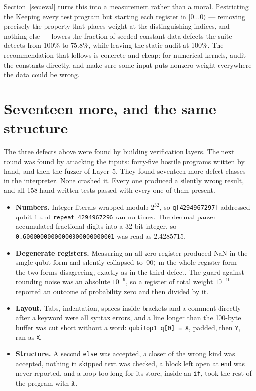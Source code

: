 \documentclass[11pt]{article}
\newcommand{\ket}[1]{\ensuremath{|#1\rangle}}
\begin{document}
Section~\ref{sec:eval} turns this into a measurement rather than a moral. Restricting the
Keeping every test program but starting each register in \ket{0\ldots0} --- removing
precisely the property that places weight at the distinguishing indices, and nothing else ---
lowers the fraction of seeded constant-data defects the suite detects from 100\% to
75.8\%, while leaving the static audit at 100\%. The
recommendation that follows is concrete and cheap: for numerical kernels, audit the
constants directly, and make sure some input puts nonzero weight everywhere the data could
be wrong.

\section{Seventeen more, and the same structure}
\label{sec:second}

The three defects above were found by building verification layers. The next round was
found by attacking the inputs: forty-five hostile programs written by hand, and then the
fuzzer of Layer~5. They found seventeen more defect classes in the interpreter. None
crashed it. Every one produced a silently wrong result, and all 158 hand-written tests
passed with every one of them present.

\begin{itemize}
  \item \textbf{Numbers.} Integer literals wrapped modulo $2^{32}$, so \texttt{q[4294967297]}
    addressed qubit 1 and \texttt{repeat 4294967296} ran no times. The decimal parser
    accumulated fractional digits into a 32-bit integer, so
    \texttt{0.60000000000000000000000001} was read as 2.4285715.
  \item \textbf{Degenerate registers.} Measuring an all-zero register produced NaN in the
    single-qubit form and silently collapsed to \ket{00} in the whole-register form ---
    the two forms disagreeing, exactly as in the third defect. The guard against rounding
    noise was an absolute $10^{-9}$, so a register of total weight $10^{-10}$ reported an
    outcome of probability zero and then divided by it.
  \item \textbf{Layout.} Tabs, indentation, spaces inside brackets and a comment directly
    after a keyword were all syntax errors, and a line longer than the 100-byte buffer was
    cut short without a word: \texttt{qubitop1 q[0] = X}, padded, then \texttt{Y}, ran
    as \texttt{X}.
  \item \textbf{Structure.} A second \texttt{else} was accepted, a closer of the wrong kind
    was accepted, nothing in skipped text was checked, a block left open at \texttt{end}
    was never reported, and a loop too long for its store, inside an \texttt{if}, took the
    rest of the program with it.
\end{itemize}
\end{document}
